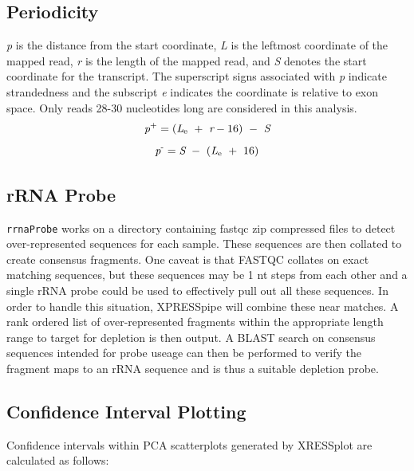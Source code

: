 \documentclass[11pt, a4paper, oneside]{article}
\begin{document}
\subsection{Periodicity}
\textit{p} is the distance from the start coordinate, \textit{L} is the leftmost coordinate of the mapped read, \textit{r} is the length of the mapped read, and \textit{S} denotes the start coordinate for the transcript. The superscript signs associated with \textit{p} indicate strandedness and the subscript \textit{e} indicates the coordinate is relative to exon space. Only reads 28-30 nucleotides long are considered in this analysis.
\begin{equation}
  \textit{p}\textsuperscript{+} = (\textit{L}\textsubscript{e}\ +\ \textit{r} - 16)\ -\ \textit{S}
\end{equation}
\begin{equation}
  \textit{p}\textsuperscript{-} = \textit{S}\ -\ (\textit{L}\textsubscript{e}\ +\ 16)
\end{equation}

\subsection{rRNA Probe}
\texttt{rrnaProbe} works on a directory containing fastqc \cite{fastqc} zip compressed files to detect over-represented sequences for each sample. These sequences are then collated to create consensus fragments. One caveat is that FASTQC collates on exact matching sequences, but these sequences may be 1 nt steps from each other and a single rRNA probe could be used to effectively pull out all these sequences. In order to handle this situation, XPRESSpipe will combine these near matches. A rank ordered list of over-represented fragments within the appropriate length range to target for depletion is then output. A BLAST \cite{blast} search on consensus sequences intended for probe useage can then be performed to verify the fragment maps to an rRNA sequence and is thus a suitable depletion probe.

\subsection{Confidence Interval Plotting}
Confidence intervals within PCA scatterplots generated by XRESSplot are calculated as follows:
\end{document}
